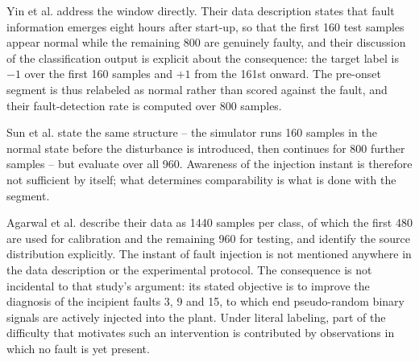 \documentclass[10pt,twocolumn,a4paper]{article}
\begin{document}
\begin{table}[t]
\centering
\caption{Treatment of the pre-onset window in observation-level studies on the
Tennessee Eastman benchmark. Three studies on the same simulator adopt three
distinct conventions: relabeling the pre-onset segment as normal, retaining it
under the fault label, and not addressing it.}
\label{tab:survey}
\small
\setlength{\tabcolsep}{4pt}
\end{table}

Yin et al. \cite{yin2014svm} address the window directly. Their data
description states that fault information emerges eight hours after start-up,
so that the first 160 test samples appear normal while the remaining 800 are
genuinely faulty, and their discussion of the classification output is explicit
about the consequence: the target label is $-1$ over the first 160 samples and
$+1$ from the 161st onward. The pre-onset segment is thus relabeled as normal
rather than scored against the fault, and their fault-detection rate is
computed over 800 samples.

Sun et al. \cite{sun2020brnn} state the same structure -- the simulator runs
160 samples in the normal state before the disturbance is introduced, then
continues for 800 further samples -- but evaluate over all 960. Awareness of
the injection instant is therefore not sufficient by itself; what determines
comparability is what is done with the segment.

Agarwal et al. \cite{agarwal2022lstm} describe their data as 1440 samples per
class, of which the first 480 are used for calibration and the remaining 960
for testing, and identify the source distribution explicitly. The instant of
fault injection is not mentioned anywhere in the data description or the
experimental protocol. The consequence is not incidental to that study's
argument: its stated objective is to improve the diagnosis of the incipient
faults 3, 9 and 15, to which end pseudo-random binary signals are actively
injected into the plant. Under literal labeling, part of the difficulty that
motivates such an intervention is contributed by observations in which no fault
is yet present.
\end{document}
